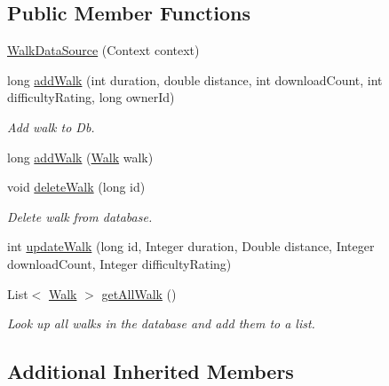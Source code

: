 \subsection*{Public Member Functions}
\begin{DoxyCompactItemize}
\item 
\hyperlink{classuk_1_1ac_1_1swan_1_1digitaltrails_1_1database_1_1_walk_data_source_a60301a5dc7794307ade6df34bd239eb2}{Walk\+Data\+Source} (Context context)
\item 
long \hyperlink{classuk_1_1ac_1_1swan_1_1digitaltrails_1_1database_1_1_walk_data_source_a404fe1da8769d8d3fc50e8c43c52bbf2}{add\+Walk} (int duration, double distance, int download\+Count, int difficulty\+Rating, long owner\+Id)
\begin{DoxyCompactList}\small\item\em Add walk to Db. \end{DoxyCompactList}\item 
long \hyperlink{classuk_1_1ac_1_1swan_1_1digitaltrails_1_1database_1_1_walk_data_source_a9b1ff0450785979c68e1668c4aec17ce}{add\+Walk} (\hyperlink{classuk_1_1ac_1_1swan_1_1digitaltrails_1_1components_1_1_walk}{Walk} walk)
\item 
void \hyperlink{classuk_1_1ac_1_1swan_1_1digitaltrails_1_1database_1_1_walk_data_source_ac568c3ebb851069f4b1d0b74204d933c}{delete\+Walk} (long id)
\begin{DoxyCompactList}\small\item\em Delete walk from database. \end{DoxyCompactList}\item 
int \hyperlink{classuk_1_1ac_1_1swan_1_1digitaltrails_1_1database_1_1_walk_data_source_a737d975ddc892d0202d0c9c70f47ea42}{update\+Walk} (long id, Integer duration, Double distance, Integer download\+Count, Integer difficulty\+Rating)
\item 
List$<$ \hyperlink{classuk_1_1ac_1_1swan_1_1digitaltrails_1_1components_1_1_walk}{Walk} $>$ \hyperlink{classuk_1_1ac_1_1swan_1_1digitaltrails_1_1database_1_1_walk_data_source_a0d66b2a623c0e8e11a995a5c4060a30f}{get\+All\+Walk} ()
\begin{DoxyCompactList}\small\item\em Look up all walks in the database and add them to a list. \end{DoxyCompactList}\end{DoxyCompactItemize}
\subsection*{Additional Inherited Members}


